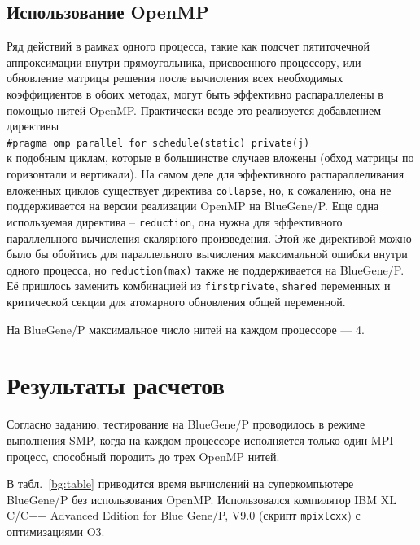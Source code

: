 \documentclass[12pt,notitlepage,oneside]{extarticle}
\begin{document}
\subsection{Использование OpenMP}
Ряд действий в рамках одного процесса, такие как подсчет пятиточечной
аппроксимации внутри прямоугольника, присвоенного процессору, или обновление
матрицы решения после вычисления всех необходимых коэффициентов в обоих методах,
могут быть эффективно распараллелены в помощью нитей OpenMP.  Практически везде
это реализуется добавлением директивы \\
\texttt{\#pragma omp parallel for schedule(static) private(j)} \\
к подобным циклам, которые в большинстве случаев вложены (обход матрицы по
горизонтали и вертикали). На самом деле для эффективного распараллеливания
вложенных циклов существует директива \texttt{collapse}, но, к сожалению, она не
поддерживается на версии реализации OpenMP на BlueGene/P. Еще одна используемая
директива -- \texttt{reduction}, она нужна для эффективного параллельного
вычисления скалярного произведения. Этой же директивой можно было бы обойтись
для параллельного вычисления максимальной ошибки внутри одного процесса, но
\texttt{reduction(max)} также не поддерживается на BlueGene/P. Её пришлось
заменить комбинацией из \texttt{firstprivate}, \texttt{shared} переменных и
критической секции для атомарного обновления общей переменной.

На BlueGene/P максимальное число нитей на каждом процессоре --- 4.

\section{Результаты расчетов}
Согласно заданию, тестирование на BlueGene/P проводилось в режиме выполнения
SMP, когда на каждом процессоре исполняется только один MPI процесс, способный
породить до трех OpenMP нитей.

В табл.~\ref{bg:table} приводится время вычислений на суперкомпьютере BlueGene/P
без использования OpenMP. Использовался компилятор IBM XL C/C++ Advanced Edition
for Blue Gene/P, V9.0 (скрипт \texttt{mpixlcxx}) с оптимизациями O3.
\end{document}
